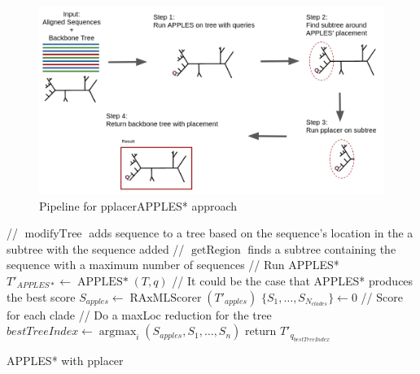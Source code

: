 \documentclass[10pt]{article}
\begin{document}
\begin{figure}[!htb]
\centering
\includegraphics[width=\textwidth]{Figs/pplacerAPPLESpipeline.png}
\caption{Pipeline for pplacerAPPLES* approach
\label{fig:pplacerAPPLES-pipeline}
}
\end{figure}

\begin{algorithm}[!htb]
\SetAlgoLined
{}
 // $\operatorname{modifyTree}$ adds sequence to a tree based on the sequence's location in the a subtree with the sequence added\;
 // $\operatorname{getRegion}$ finds a subtree containing the sequence with a maximum number of sequences\;
  // Run APPLES*\;
  $T'_{APPLES*} \leftarrow \operatorname{APPLES*}(T, q)$\;
  // It could be the case that APPLES* produces the best score\;
  $S_{apples} \leftarrow \operatorname{RAxMLScorer}( T'_{apples})$\;
  $\{S_1, \dots, S_{N_{clades}}\} \leftarrow 0$ // Score for each clade\;
 // Do a maxLoc reduction for the tree\;
 $bestTreeIndex \leftarrow \operatorname{argmax}_{i} (S_{apples},S_1,\dots,S_n)$\;
 return $T'_{q_{bestTreeIndex}}$\;
\caption{APPLES* with pplacer}
 \label{alg:approach2}
\end{algorithm}
\end{document}
